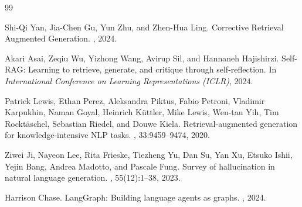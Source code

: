 \documentclass[12pt,a4paper]{article}
\begin{document}
\newpage

\begin{thebibliography}{99}

Shi-Qi Yan, Jia-Chen Gu, Yun Zhu, and Zhen-Hua Ling.
\newblock Corrective Retrieval Augmented Generation.
, 2024.

Akari Asai, Zeqiu Wu, Yizhong Wang, Avirup Sil, and Hannaneh Hajishirzi.
\newblock Self-RAG: Learning to retrieve, generate, and critique through self-reflection.
\newblock In {\em International Conference on Learning Representations (ICLR)}, 2024.

Patrick Lewis, Ethan Perez, Aleksandra Piktus, Fabio Petroni, Vladimir Karpukhin, Naman Goyal, Heinrich K{\"u}ttler, Mike Lewis, Wen-tau Yih, Tim Rockt{\"a}schel, Sebastian Riedel, and Douwe Kiela.
\newblock Retrieval-augmented generation for knowledge-intensive NLP tasks.
, 33:9459--9474, 2020.

Ziwei Ji, Nayeon Lee, Rita Frieske, Tiezheng Yu, Dan Su, Yan Xu, Etsuko Ishii, Yejin Bang, Andrea Madotto, and Pascale Fung.
\newblock Survey of hallucination in natural language generation.
, 55(12):1--38, 2023.

Harrison Chase.
\newblock LangGraph: Building language agents as graphs.
, 2024.

\end{thebibliography}
\end{document}
